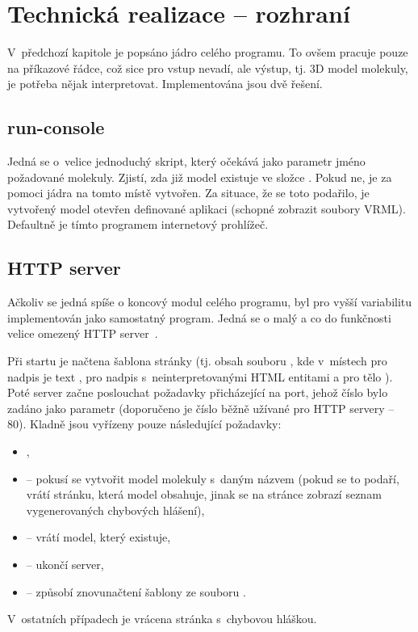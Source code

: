 \chapter{Technická realizace -- rozhraní}
V~předchozí kapitole je popsáno jádro celého programu. To ovšem pracuje pouze na
příkazové řádce, což sice pro vstup nevadí, ale výstup, tj. 3D model molekuly,
je potřeba nějak interpretovat. Implementována jsou dvě řešení.

\section{run-console}
Jedná se o~velice jednoduchý skript, který očekává jako parametr jméno
požadované molekuly. Zjistí, zda již model existuje ve složce .
Pokud ne, je za pomoci jádra na tomto místě vytvořen. Za situace, že se toto
podařilo, je vytvořený model otevřen definované aplikaci (schopné zobrazit
soubory VRML). Defaultně je tímto programem internetový prohlížeč.

\section{HTTP server}
Ačkoliv se jedná spíše o koncový modul celého programu, byl pro vyšší
variabilitu implementován jako samostatný program. Jedná se o malý a co do
funkčnosti velice omezený HTTP server~\cite{Berners:rfc1945}.

Při startu je načtena šablona stránky (tj. obsah souboru ,
kde v~místech pro nadpis je text , pro nadpis s~neinterpretovanými
HTML entitami  a pro tělo ). Poté server začne
poslouchat požadavky přicházející na port, jehož číslo bylo zadáno jako parametr
(doporučeno je číslo běžně užívané pro HTTP servery -- 80). Kladně jsou vyřízeny
pouze následující požadavky:
\begin{itemize}
	\item {},
	\item {} -- pokusí se vytvořit model
		  molekuly s~daným názvem (pokud se to podaří, vrátí stránku, která model
		  obsahuje, jinak se na stránce zobrazí seznam vygenerovaných chy\-bo\-vých
		  hlášení),
	\item {} -- vrátí model, který existuje,
	\item {} -- ukončí server,
	\item {} -- způsobí znovunačtení šablony ze souboru
		  .
\end{itemize}
V~ostatních případech je vrácena stránka s~chybovou hláškou.

